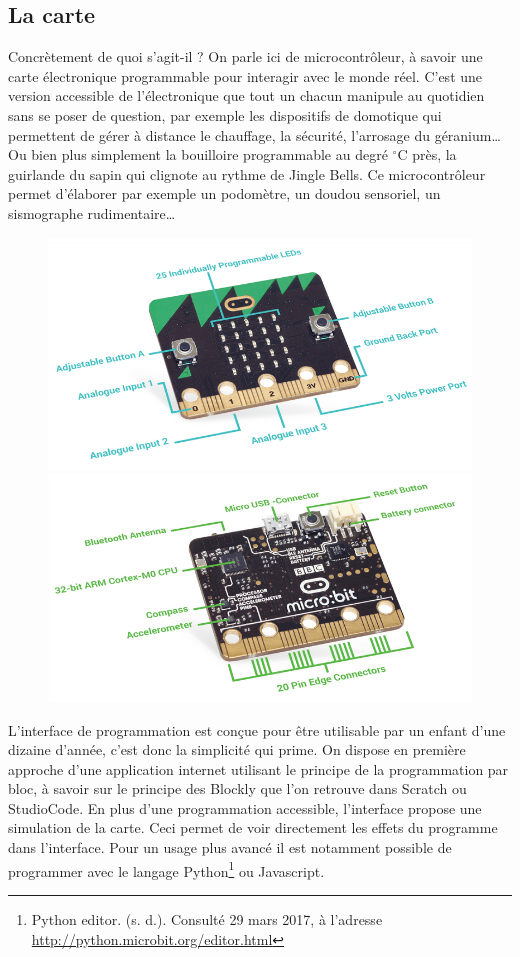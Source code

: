\subsection{La carte \mb}

Concrètement de quoi s’agit-il ? On parle ici de microcontrôleur, à savoir une carte électronique programmable pour interagir avec le monde réel.
C’est une version accessible de l’électronique que tout un chacun manipule au quotidien sans se poser de question, par exemple les dispositifs de domotique qui permettent de gérer à distance le chauffage, la sécurité, l’arrosage du géranium… Ou bien plus simplement la bouilloire programmable au degré ${}^{\circ}$C près, la guirlande du sapin qui clignote au rythme de Jingle Bells. 
Ce microcontrôleur permet d’élaborer par exemple un podomètre, un doudou sensoriel, un sismographe rudimentaire\ldots

\begin{figure}
    \centering
    \includegraphics[width=0.49\linewidth]{res/mb-ap-04}
    \hfill
    \includegraphics[width=0.49\linewidth]{res/mb-ap-05}
\end{figure}

L’interface de programmation est conçue pour être utilisable par un enfant d’une dizaine d’année, c’est donc la simplicité qui prime. On dispose en première approche d’une application internet utilisant le principe de la programmation par bloc, à savoir sur le principe des Blockly que l’on retrouve dans Scratch ou StudioCode. En plus d’une programmation accessible, l’interface propose une simulation de la carte. Ceci permet de voir directement les effets du programme dans l’interface. Pour un usage plus avancé il est notamment possible de programmer avec le langage Python\footnote{Python editor. (s. d.). Consulté 29 mars 2017, à l’adresse \url{http://python.microbit.org/editor.html}} ou Javascript.


